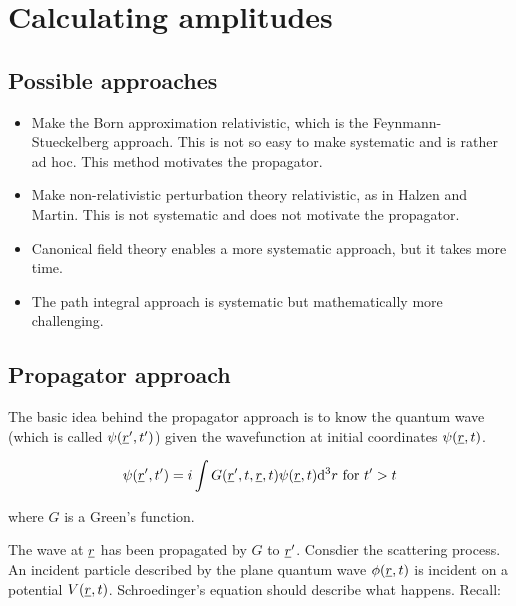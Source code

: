 
\chapter{Calculating amplitudes}

\section{Possible approaches}

\begin{itemize}
  \item Make the Born approximation relativistic, which is the Feynmann-Stueckelberg approach.  This is not so easy to make systematic and is rather ad hoc.  This method motivates the propagator.
  \item Make non-relativistic perturbation theory relativistic, as in Halzen and Martin.  This is not systematic and does not motivate the propagator.
  \item Canonical field theory enables a more systematic approach, but it takes more time.
  \item The path integral approach is systematic but mathematically more challenging.
\end{itemize}

\section{Propagator approach}

The basic idea behind the propagator approach is to know the quantum wave (which is called $\psi(\underline{r}',t')$) given the wavefunction at initial coordinates $\psi(\underline{r},t)$.

\[
  \psi(\underline{r}',t') = i\int G(\underline{r}',t,\underline{r},t)\psi(\underline{r},t)\mathrm{d}^3r \textrm{ for } t' > t
\]

where $G$ is a Green's function.

The wave at $\underline{r}$ has been propagated by $G$ to $\underline{r}'$.  Consdier the scattering process.  An incident particle described by the plane quantum wave $\phi(\underline{r},t)$ is incident on a potential $V(\underline{r},t)$.  Schroedinger's equation should describe what happens.  Recall:

